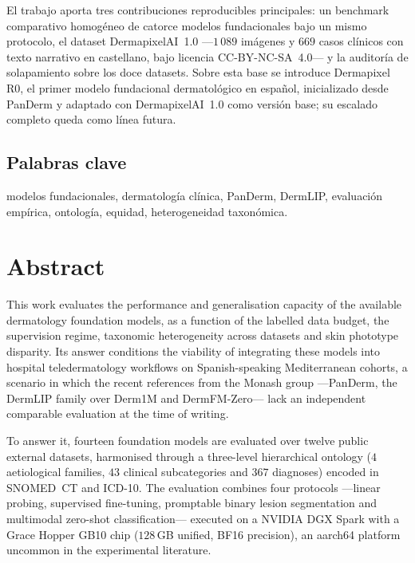 El trabajo aporta tres contribuciones reproducibles principales: un
benchmark comparativo homogéneo de catorce modelos fundacionales
bajo un mismo protocolo, el dataset DermapixelAI~1.0 ---$1\,089$ imágenes y $669$
casos clínicos con texto narrativo en castellano, bajo licencia
CC-BY-NC-SA~4.0--- y la auditoría de solapamiento sobre los doce
datasets. Sobre esta base se introduce Dermapixel R0, el
primer modelo fundacional dermatológico en español, inicializado
desde PanDerm y adaptado con DermapixelAI~1.0 como versión base; su
escalado completo queda como línea futura.

\vspace*{-0.4cm}
\section*{Palabras clave}
modelos fundacionales, dermatología clínica, PanDerm, DermLIP,
evaluación empírica, ontología, equidad, heterogeneidad taxonómica.


\chapter*{Abstract}
\vspace*{-1.5cm}

This work evaluates the performance and generalisation capacity of
the available dermatology foundation models, as a function of the
labelled data budget, the supervision regime, taxonomic
heterogeneity across datasets and skin phototype disparity. Its
answer conditions the
viability of integrating these models into hospital teledermatology
workflows on Spanish-speaking Mediterranean cohorts, a scenario in
which the recent references from the Monash group ---PanDerm, the
DermLIP family over Derm1M and DermFM-Zero--- lack an independent
comparable evaluation at the time of writing.

To answer it, fourteen foundation models are evaluated over twelve
public external datasets, harmonised through a three-level
hierarchical ontology ($4$ aetiological families, $43$ clinical
subcategories and $367$ diagnoses) encoded in SNOMED~CT and ICD-10.
The evaluation combines four protocols ---linear probing, supervised
fine-tuning, promptable binary lesion segmentation and multimodal
zero-shot classification--- executed on a NVIDIA DGX Spark with a
Grace Hopper GB10 chip ($128$\,GB unified, BF16 precision), an
aarch64 platform uncommon in the experimental literature.

